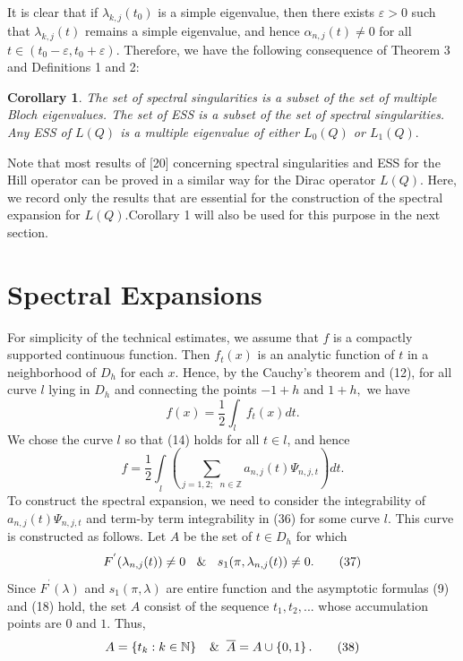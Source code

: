 \documentclass{article}%
\newtheorem{corollary}{Corollary}
\begin{document}
It is clear that if $\lambda_{k,j}(t_{0})$ is a simple eigenvalue, then there
exists $\varepsilon>0$ such that $\lambda_{k,j}(t)$ remains a simple
eigenvalue, and hence $\alpha_{n,j}(t)\neq0$ for all $t\in\left(
t_{0}-\varepsilon,t_{0}+\varepsilon\right)  .$ Therefore, we have the
following consequence of Theorem 3 and Definitions 1 and 2:

\begin{corollary}
The set of spectral singularities is a subset of the set of multiple Bloch
eigenvalues. The set of ESS is a subset of the set of spectral singularities.
Any ESS of $L(Q)$ is a multiple eigenvalue of either $L_{0}(Q)$ or $L_{1}(Q).$
\end{corollary}

Note that most results of [20] concerning spectral singularities and ESS for
the Hill operator can be proved in a similar way for the Dirac operator
$L(Q).$ Here, we record only the results that are essential for the
construction of the spectral expansion for $L(Q).$Corollary 1 will also be
used for this purpose in the next section.

\section{Spectral Expansions}

For simplicity of the technical estimates, we assume that $f$ is a compactly
supported continuous function. Then $f_{t}(x)$ is an analytic function of $t$
in a neighborhood of $D_{h}$ for each $x$. Hence, by the Cauchy's theorem and
(12), for all curve $l$ lying in $D_{h}$ and connecting the points $-1+h$ and
$1+h,$ we have
\begin{equation}
f(x)=\frac{1}{2}\int_{l}f_{t}(x)dt. \tag{35}%
\end{equation}
We chose the curve $l$ so that (14) holds for all $t\in l$, and hence
\begin{equation}
f=\frac{1}{2}\int\limits_{l}\left(  \sum_{j=1,2;\text{ }n\in\mathbb{Z}}%
a_{n,j}(t)\Psi_{n,j,t}\right)  dt. \tag{36}%
\end{equation}
To construct the spectral expansion, we need to consider the integrability of
$a_{n,j}(t)\Psi_{n,j,t}$ and term-by term integrability in (36) for some curve
$l$. This curve is constructed as follows. Let $A$ be the set of $t\in D_{h}$
for which
\begin{equation}
F^{^{\prime}}(\lambda_{n,j}(t))\neq0\text{ }\And\text{ }s_{1}(\pi
,\lambda_{n,j}(t))\neq0. \tag{37}%
\end{equation}
Since $F^{^{\prime}}(\lambda)$ and $s_{1}(\pi,\lambda)$ are entire function
and the asymptotic formulas (9) and (18) hold, the set $A$ consist of the
sequence $t_{1},t_{2},...$ whose accumulation points are $0$ and $1.$ Thus,
\begin{equation}
A=\left\{  t_{k}:k\in\mathbb{N}\right\}  \text{ }\And\overline{A}%
=A\cup\left\{  0,1\right\}  . \tag{38}%
\end{equation}
\end{document}
